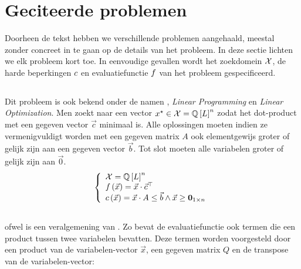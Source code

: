 \section{Geciteerde problemen}

Doorheen de tekst hebben we verschillende problemen aangehaald, meestal zonder concreet in te gaan op de details van het probleem. In deze sectie lichten we elk probleem kort toe. In eenvoudige gevallen wordt het zoekdomein $\ConfigSet$, de harde beperkingen $\hcfun$ en evaluatiefunctie $\evalfun$ van het probleem gespecificeerd.

\subsection{}

Dit probleem is ook bekend onder de namen , \emph{Linear Programming} en \emph{Linear Optimization}. Men zoekt naar een vector $\xstar\in\ConfigSet=\QbitSet{\bitvar}^n$ zodat het dot-product met een gegeven vector $\vec{c}$ minimaal is. Alle oplossingen moeten indien ze vermenigvuldigt worden met een gegeven matrix $A$ ook elementgewijs groter of gelijk zijn aan een gegeven vector $\vec{b}$. Tot slot moeten alle variabelen groter of gelijk zijn aan $\vec{0}$.
\begin{equation}
\guards{
\ConfigSet=\QbitSet{\bitvar}^n\\
\fun{\evalfun}{\vec{x}}=\vec{x}\cdot\transpose{\vec{c}}\\
\fun{\hcfun}{\vec{x}}=\vec{x}\cdot A\leq\vec{b}\wedge\vec{x}\geq\zeromatrix[1\times n]
}
\end{equation}

\subsection{}

 ofwel  is een veralgemening van . Zo bevat de evaluatiefunctie ook termen die een product tussen twee variabelen bevatten. Deze termen worden voorgesteld door een product van de variabelen-vector $\vec{x}$, een gegeven matrix $Q$ en de transpose van de variabelen-vector:

